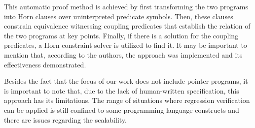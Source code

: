 This automatic proof method is achieved by first transforming the two programs into Horn clauses over uninterpreted predicate symbols. 
Then, these clauses constrain equivalence witnessing coupling predicates that establish the relation of the two programs at key points.
Finally, if there is a solution for the coupling predicates, a Horn constraint solver is utilized to find it.
It may be important to mention that, according to the authors, the approach was implemented and its effectiveness demonstrated.

Besides the fact that the focus of our work does not include pointer programs, it is important to note that, due to the lack of human-written specification, this approach has its limitations.
The range of situations where regression verification can be applied is still confined to some programming language constructs and there are issues regarding the scalability.
\fi
